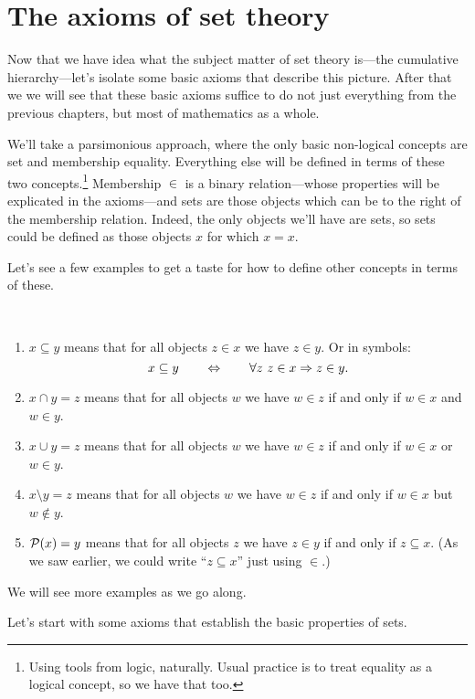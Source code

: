 \documentclass[10pt]{amsart}
\begin{document}
\newpage


\section{The axioms of set theory}

Now that we have idea what the subject matter of set theory is---the cumulative hierarchy---let's isolate some basic axioms that describe this picture. After that we we will see that these basic axioms suffice to do not just everything from the previous chapters, but most of mathematics as a whole.

We'll take a parsimonious approach, where the only basic non-logical concepts are set and membership equality. Everything else will be defined in terms of these two concepts.\footnote{Using tools from logic, naturally. Usual practice is to treat equality as a logical concept, so we have that too.}
Membership $\in$ is a binary relation---whose properties will be explicated in the axioms---and sets are those objects which can be to the right of the membership relation. Indeed, the only objects we'll have are sets, so sets could be defined as those objects $x$ for which $x = x$. 

Let's see a few examples to get a taste for how to define other concepts in terms of these. 
\begin{example}\ 
\begin{enumerate}
\item $x \subseteq y$ means that for all objects $z \in x$ we have $z \in y$. Or in symbols:
\[
x \subseteq y \qquad \Leftrightarrow \qquad \forall z\ z \in x \Rightarrow z \in y.
\]
\item $x \cap y = z$ means that for all objects $w$ we have $w \in z$ if and only if $w \in x$ and $w \in y$.
\item $x \cup y = z$ means that for all objects $w$ we have $w \in z$ if and only if $w \in x$ or $w \in y$.
\item $x \setminus y = z$ means that for all objects $w$ we have $w \in z$ if and only if $w \in x$ but $w \not \in y$.
\item $\mathcal{P}(x) = y$ means that for all objects $z$ we have $z \in y$ if and only if $z \subseteq x$. (As we saw earlier, we could write ``$z \subseteq x$'' just using $\in$.)
\end{enumerate}
\end{example}

We will see more examples as we go along.
\smallskip

Let's start with some axioms that establish the basic properties of sets.
\end{document}

